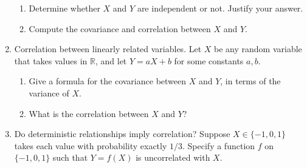 \documentclass{article}
\begin{document}
\begin{enumerate}
    \begin{enumerate}
    \item Determine whether $X$ and $Y$ are independent or not. Justify your answer.
    \item Compute the covariance and correlation between $X$ and $Y$.
    \end{enumerate}

\item Correlation between linearly related variables. Let $X$ be any random variable that takes values in $\mathbb{R}$, and let $Y=a X+b$ for some constants $a, b$.
    \begin{enumerate}
    \item Give a formula for the covariance between $X$ and $Y$, in terms of the variance of $X$.
    \item What is the correlation between $X$ and $Y$?
    \end{enumerate}

\item Do deterministic relationships imply correlation? Suppose $X \in\{-1,0,1\}$ takes each value with probability exactly $1 / 3$. Specify a function $f$ on $\{-1,0,1\}$ such that $Y=f(X)$ is uncorrelated with $X$.

\end{enumerate}
\end{document}
